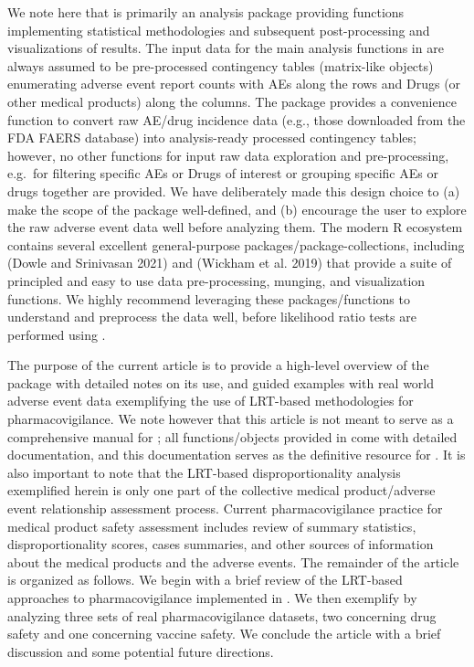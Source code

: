We note here that  is primarily an analysis package providing functions implementing statistical methodologies and subsequent post-processing and visualizations of results. The input data for the main analysis functions in  are always assumed to be pre-processed contingency tables (matrix-like objects) enumerating adverse event report counts with AEs along the rows and Drugs (or other medical products) along the columns. The package provides a convenience function to convert raw AE/drug incidence data (e.g., those downloaded from the FDA FAERS database) into analysis-ready processed contingency tables; however, no other functions for input raw data exploration and pre-processing, e.g.~for filtering specific AEs or Drugs of interest or grouping specific AEs or drugs together are provided. We have deliberately made this design choice to (a) make the scope of the package well-defined, and (b) encourage the user to explore the raw adverse event data well before analyzing them. The modern R ecosystem contains several excellent general-purpose packages/package-collections, including  (Dowle and Srinivasan 2021) and  (Wickham et al. 2019) that provide a suite of principled and easy to use data pre-processing, munging, and visualization functions. We highly recommend leveraging these packages/functions to understand and preprocess the data well, before likelihood ratio tests are performed using .

The purpose of the current article is to provide a high-level overview of the  package with detailed notes on its use, and guided examples with real world adverse event data exemplifying the use of LRT-based methodologies for pharmacovigilance. We note however that this article is not meant to serve as a comprehensive manual for ; all functions/objects provided in  come with detailed documentation, and this documentation serves as the definitive resource for . It is also important to note that the LRT-based disproportionality analysis exemplified herein is only one part of the collective medical product/adverse event relationship assessment process. Current pharmacovigilance practice for medical product safety assessment includes review of summary statistics, disproportionality scores, cases summaries, and other sources of information about the medical products and the adverse events. The remainder of the article is organized as follows. We begin with a brief review of the LRT-based approaches to pharmacovigilance implemented in . We then exemplify  by analyzing three sets of real pharmacovigilance datasets, two concerning drug safety and one concerning vaccine safety. We conclude the article with a brief discussion and some potential future directions.

